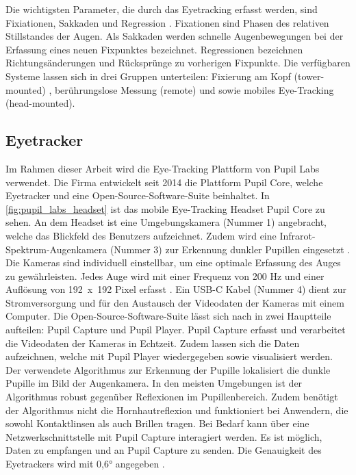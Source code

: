 Die wichtigsten Parameter, die durch das Eyetracking erfasst werden, sind Fixiationen, Sakkaden und Regression \cite{BartlPokorny.2013}. \glqq Fixationen sind Phasen des relativen Stillstandes der Augen.\grqq \cite{Blake.2013} Als Sakkaden werden schnelle Augenbewegungen bei der Erfassung eines neuen Fixpunktes bezeichnet. Regressionen bezeichnen Richtungsänderungen und Rücksprünge zu vorherigen Fixpunkte. Die verfügbaren Systeme lassen sich in drei Gruppen unterteilen: Fixierung am Kopf (tower-mounted) , berührungslose Messung (remote) und sowie mobiles Eye-Tracking (head-mounted). \cite{BartlPokorny.2013}

\subsection{Eyetracker}
Im Rahmen dieser Arbeit wird die Eye-Tracking Plattform von Pupil Labs verwendet. Die Firma entwickelt seit 2014 die Plattform Pupil Core, welche Eyetracker und eine Open-Source-Software-Suite beinhaltet. In \autoref{fig:pupil_labs_headset} ist das mobile Eye-Tracking Headset Pupil Core zu sehen. An dem Headset ist eine Umgebungskamera (Nummer 1) angebracht, welche das Blickfeld des Benutzers aufzeichnet. Zudem wird eine Infrarot-Spektrum-Augenkamera (Nummer 3) zur Erkennung dunkler Pupillen eingesetzt \cite{Kassner_2014}. Die Kameras sind individuell einstellbar, um eine optimale Erfassung des Auges zu gewährleisten. Jedes Auge wird mit einer Frequenz von 200 Hz und einer Auflösung von \mbox{192 x 192} Pixel erfasst \cite{PupilLabsSpec}. Ein USB-C Kabel (Nummer 4) dient zur Stromversorgung und für den Austausch der Videodaten der Kameras mit einem Computer. Die Open-Source-Software-Suite lässt sich nach \citeauthor{Kassner_2014} in zwei Hauptteile aufteilen: Pupil Capture und Pupil Player. Pupil Capture erfasst und verarbeitet die Videodaten der Kameras in Echtzeit. Zudem lassen sich die Daten aufzeichnen, welche mit Pupil Player wiedergegeben sowie visualisiert werden. Der verwendete Algorithmus zur Erkennung der Pupille lokalisiert die dunkle Pupille im Bild der Augenkamera. In den meisten Umgebungen ist der Algorithmus robust gegenüber Reflexionen im Pupillenbereich. Zudem benötigt der Algorithmus nicht die Hornhautreflexion und funktioniert bei Anwendern, die sowohl Kontaktlinsen als auch Brillen tragen. \cite{Kassner_2014} Bei Bedarf kann über eine Netzwerkschnittstelle mit Pupil Capture interagiert werden. Es ist möglich, Daten zu empfangen und an Pupil Capture zu senden. \cite{PupilLabsNet} Die Genauigkeit des Eyetrackers wird mit 0,6° angegeben \cite{PupilLabsSpec}.

